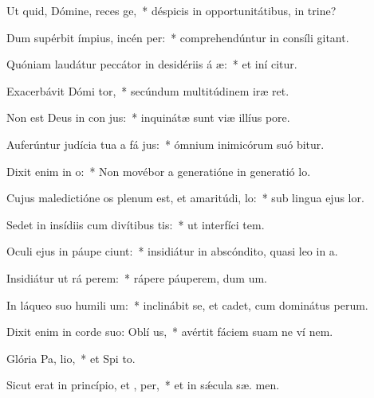 \item Ut quid, Dómine, reces ge,~* déspicis in opportunitátibus, in trine?
\item Dum supérbit ímpius, incén per:~* comprehendúntur in consíli  gitant.
\item Quóniam laudátur peccátor in desidériis á æ:~* et iní citur.
\item Exacerbávit Dómi tor,~* secúndum multitúdinem iræ   ret.
\item Non est Deus in con jus:~* inquinátæ sunt viæ illíus   pore.
\item Auferúntur judícia tua a fá jus:~* ómnium inimicórum suó bitur.
\item Dixit enim in  o:~* Non movébor a generatióne in generatió  lo.
\item Cujus maledictióne os plenum est, et amaritúdi,  lo:~* sub lingua ejus   lor.
\item Sedet in insídiis cum divítibus  tis:~* ut interfíci tem.
\item Oculi ejus in páupe ciunt:~* insidiátur in abscóndito, quasi leo in  a.
\item Insidiátur ut rá perem:~* rápere páuperem, dum  um.
\item In láqueo suo humili um:~* inclinábit se, et cadet, cum dominátus  perum.
\item Dixit enim in corde suo: Oblí  us,~* avértit fáciem suam ne ví  nem.
\item Glória Pa,  lio,~* et Spi to.
\item Sicut erat in princípio, et ,  per,~* et in sǽcula sæ. men.
